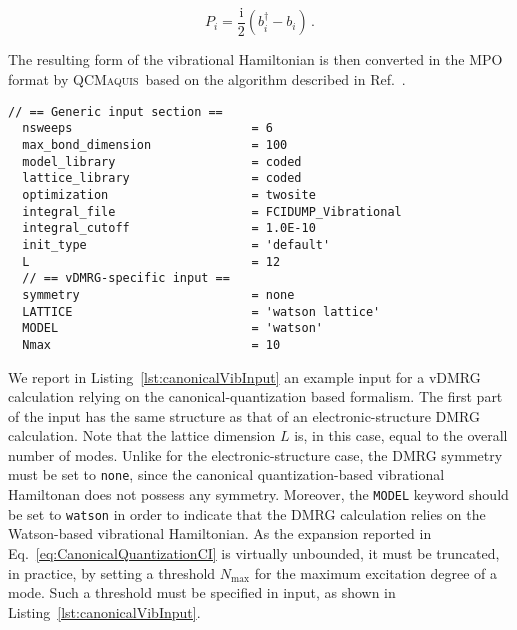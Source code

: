 \documentclass[bibliography=totoc,12pt,a4paper]{scrartcl}
\newcommand{\qcm}{\textsc{QCMaquis}}
\begin{document}
\begin{equation}
  P_i = \frac{\mathrm{i}}{2} \left( b_i^\dagger - b_i \right) \, .
  \label{eq:CanonicalQuantizationMomentum}
\end{equation}

The resulting form of the vibrational Hamiltonian is then converted in the MPO format by \qcm\ based on the algorithm described in Ref.~. \\

\begin{lstlisting}[language=qcmaquis,
				   caption={Input example for a canonical quantization-based vDMRG-FCI calculation},
				   label=lst:canonicalVibInput]
  // == Generic input section ==
  nsweeps                         = 6
  max_bond_dimension              = 100
  model_library                   = coded
  lattice_library                 = coded
  optimization                    = twosite 
  integral_file                   = FCIDUMP_Vibrational
  integral_cutoff                 = 1.0E-10
  init_type                       = 'default'
  L                               = 12
  // == vDMRG-specific input ==
  symmetry                        = none
  LATTICE                         = 'watson lattice'
  MODEL                           = 'watson'
  Nmax                            = 10
\end{lstlisting}

We report in Listing~\ref{lst:canonicalVibInput} an example input for a vDMRG calculation relying on the canonical-quantization based formalism.
The first part of the input has the same structure as that of an electronic-structure DMRG calculation.
Note that the lattice dimension $L$ is, in this case, equal to the overall number of modes.
Unlike for the electronic-structure case, the DMRG symmetry must be set to \texttt{none}, since the canonical quantization-based vibrational Hamiltonan does not possess any symmetry.
Moreover, the \texttt{MODEL} keyword should be set to \texttt{watson} in order to indicate that the DMRG calculation relies on the Watson-based vibrational Hamiltonian.
As the expansion reported in Eq.~\ref{eq:CanonicalQuantizationCI} is virtually unbounded, it must be truncated, in practice, by setting a threshold $N_\text{max}$ for the maximum excitation degree of a mode.
Such a threshold must be specified in input, as shown in Listing~\ref{lst:canonicalVibInput}.
\end{document}
